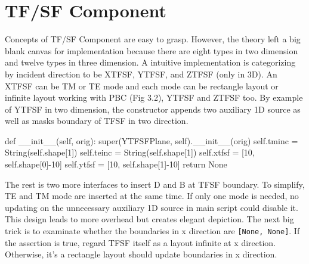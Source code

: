 \section{TF/SF Component}
Concepts of TF/SF Component are easy to grasp. However, the theory left a big blank canvas for implementation because
there are eight types in two dimension and twelve types in three dimension. A intuitive implementation is categorizing
by incident direction to be XTFSF, YTFSF, and ZTFSF (only in 3D). An XTFSF can be TM or TE mode and each mode can be
rectangle layout or infinite layout working with PBC (Fig 3.2), YTFSF and ZTFSF too. By example of YTFSF in two
dimension, the constructor appends two auxiliary 1D source as well as masks boundary of TFSF in two direction. 
\begin{code}
    def __init__(self, orig):
        super(YTFSFPlane, self).__init__(orig)
        self.tminc = String(self.shape[1])
        self.teinc = String(self.shape[1])
        self.xtfsf = [10, self.shape[0]-10]
        self.ytfsf = [10, self.shape[1]-10]
        return None
\end{code}
The rest is two more interfaces to insert D and B at TFSF boundary. To simplify, TE and TM mode are inserted at the same
time. If only one mode is needed, no updating on the unnecessary auxiliary 1D source in main script could disable
it. This design leads to more overhead but creates elegant depiction. The next big trick is to examinate whether the
boundaries in x direction are \texttt{[None, None]}. If the assertion is true, regard TFSF itself as a layout infinite
at x direction. Otherwise, it's a rectangle layout should update boundaries in x direction.
